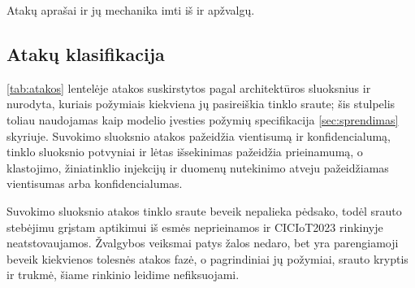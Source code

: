Atakų aprašai ir jų mechanika imti iš \citeauthor{sasi2024attacks}
\cite{sasi2024attacks} ir \citeauthor{fei2023systematic}
\cite{fei2023systematic} apžvalgų.

\subsection{Atakų klasifikacija}
\label{sec:klasifikacija}

\ref{tab:atakos} lentelėje atakos suskirstytos pagal architektūros
sluoksnius ir nurodyta, kuriais požymiais kiekviena jų pasireiškia tinklo
sraute; šis stulpelis toliau naudojamas kaip modelio įvesties požymių
specifikacija \ref{sec:sprendimas} skyriuje. Suvokimo sluoksnio atakos
pažeidžia vientisumą ir konfidencialumą, tinklo sluoksnio potvyniai ir
lėtas išsekinimas pažeidžia prieinamumą, o klastojimo, žiniatinklio
injekcijų ir duomenų nutekinimo atveju pažeidžiamas vientisumas arba
konfidencialumas.

Suvokimo sluoksnio atakos tinklo sraute beveik nepalieka pėdsako, todėl
srauto stebėjimu grįstam aptikimui iš esmės neprieinamos ir CICIoT2023
rinkinyje neatstovaujamos. Žvalgybos veiksmai patys žalos nedaro, bet yra
parengiamoji beveik kiekvienos tolesnės atakos fazė, o pagrindiniai jų
požymiai, srauto kryptis ir trukmė, šiame rinkinio leidime
nefiksuojami.

